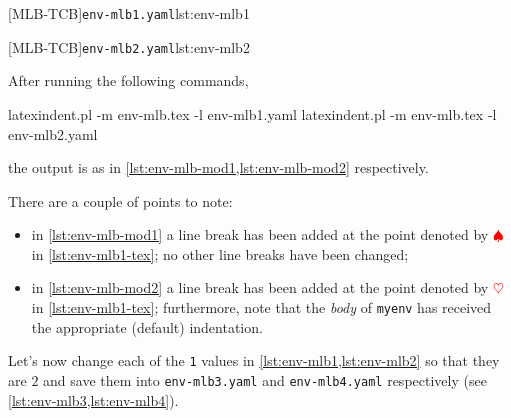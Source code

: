 		\begin{minipage}{.45\textwidth}
			{\texttt{env-mlb1.yaml}}{lst:env-mlb1}
		\end{minipage}
		\hfill
		\begin{minipage}{.45\textwidth}
			{\texttt{env-mlb2.yaml}}{lst:env-mlb2}
		\end{minipage}

		After running the following commands,
		\begin{commandshell}
latexindent.pl -m env-mlb.tex -l env-mlb1.yaml
latexindent.pl -m env-mlb.tex -l env-mlb2.yaml
\end{commandshell}
		the output is as in \cref{lst:env-mlb-mod1,lst:env-mlb-mod2} respectively.

		\begin{widepage}
			\begin{minipage}{.56\linewidth}
			\end{minipage}
			\hfill
			\begin{minipage}{.43\linewidth}
			\end{minipage}
		\end{widepage}

		There are a couple of points to note:
		\begin{itemize}
			\item in \cref{lst:env-mlb-mod1} a line break has been added at the point denoted by
			      $\color{red}\spadesuit$ in \cref{lst:env-mlb1-tex}; no other line breaks have been
			      changed;
			\item in \cref{lst:env-mlb-mod2} a line break has been added at the point denoted by
			      $\color{red}\heartsuit$ in \cref{lst:env-mlb1-tex}; furthermore, note that the \emph{body}
			      of \texttt{myenv} has received the appropriate (default) indentation.
		\end{itemize}

		Let's now change each of the \texttt{1} values in \cref{lst:env-mlb1,lst:env-mlb2} so
		that they are $2$ and save them into \texttt{env-mlb3.yaml} and \texttt{env-mlb4.yaml}
		respectively (see \cref{lst:env-mlb3,lst:env-mlb4}).

